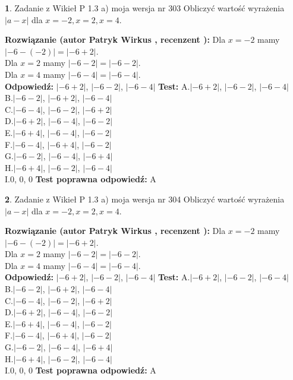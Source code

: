 \documentclass[12pt, a4paper]{article}
\theoremstyle{definition} %
\newtheorem{zad}{}
\newcommand{\zadStart}[1]{\begin{zad}#1\newline}
\newcommand{\zadStop}{\end{zad}}
\newcommand{\rozwStart}[2]{\noindent \textbf{Rozwiązanie (autor #1 , recenzent #2): }\newline}
\newcommand{\rozwStop}{\newline}
\newcommand{\odpStart}{\noindent \textbf{Odpowiedź:}\newline}
\newcommand{\odpStop}{\newline}
\newcommand{\testStart}{\noindent \textbf{Test:}\newline}
\newcommand{\testStop}{\newline}
\newcommand{\kluczStart}{\noindent \textbf{Test poprawna odpowiedź:}\newline}
\newcommand{\kluczStop}{\newline}
\begin{document}
\zadStart{Zadanie z Wikieł P 1.3 a) moja wersja nr 303}
Obliczyć wartość wyrażenia $|a - x|$ dla $x=-2,x=2,x=4$.
\zadStop
\rozwStart{Patryk Wirkus}{}
Dla $x = -2$ mamy $|-6 - (-2)| = |-6 + 2|$.\\
Dla $x = 2$ mamy $|-6 - 2| = |-6 - 2|$.\\
Dla $x = 4$ mamy $|-6 - 4| = |-6 - 4|$.\\
\rozwStop
\odpStart
$|-6 + 2|$, $|-6 - 2|$, $|-6 - 4|$
\odpStop
\testStart
A.$|-6 + 2|$, $|-6 - 2|$, $|-6 - 4|$\\
B.$|-6 - 2|$, $|-6 + 2|$, $|-6 - 4|$\\
C.$|-6 - 4|$, $|-6 - 2|$, $|-6 + 2|$\\
D.$|-6 + 2|$, $|-6 - 4|$, $|-6 - 2|$\\
E.$|-6 + 4|$, $|-6 - 4|$, $|-6 - 2|$\\
F.$|-6 - 4|$, $|-6 + 4|$, $|-6 - 2|$\\
G.$|-6 - 2|$, $|-6 - 4|$, $|-6 + 4|$\\
H.$|-6 + 4|$, $|-6 - 2|$, $|-6 - 4|$\\
I.$0$, $0$, $0$
\testStop
\kluczStart
A
\kluczStop



\zadStart{Zadanie z Wikieł P 1.3 a) moja wersja nr 304}
Obliczyć wartość wyrażenia $|a - x|$ dla $x=-2,x=2,x=4$.
\zadStop
\rozwStart{Patryk Wirkus}{}
Dla $x = -2$ mamy $|-6 - (-2)| = |-6 + 2|$.\\
Dla $x = 2$ mamy $|-6 - 2| = |-6 - 2|$.\\
Dla $x = 4$ mamy $|-6 - 4| = |-6 - 4|$.\\
\rozwStop
\odpStart
$|-6 + 2|$, $|-6 - 2|$, $|-6 - 4|$
\odpStop
\testStart
A.$|-6 + 2|$, $|-6 - 2|$, $|-6 - 4|$\\
B.$|-6 - 2|$, $|-6 + 2|$, $|-6 - 4|$\\
C.$|-6 - 4|$, $|-6 - 2|$, $|-6 + 2|$\\
D.$|-6 + 2|$, $|-6 - 4|$, $|-6 - 2|$\\
E.$|-6 + 4|$, $|-6 - 4|$, $|-6 - 2|$\\
F.$|-6 - 4|$, $|-6 + 4|$, $|-6 - 2|$\\
G.$|-6 - 2|$, $|-6 - 4|$, $|-6 + 4|$\\
H.$|-6 + 4|$, $|-6 - 2|$, $|-6 - 4|$\\
I.$0$, $0$, $0$
\testStop
\kluczStart
A
\kluczStop
\end{document}
